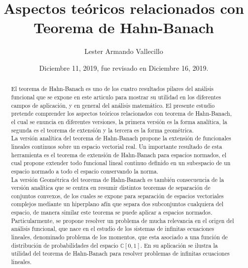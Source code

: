 \documentclass[10pt]{amsart}
\theoremstyle{remark}
\numberwithin{equation}{section}
\begin{document}
\title{Aspectos teóricos relacionados con Teorema de Hahn-Banach}

\author{Lester Armando Vallecillo}
\address{Departamento de Matemáticas, Universidad Nacional Autónoma de Honduras, Francisco Morazán, Tegucigalpa 11101}

\date{Diciembre 11, 2019, fue revisado en Diciembre 16, 2019.}

\maketitle

\begin{abstract}
El teorema de Hahn-Banach es uno de los cuatro resultados pilares del análisis funcional que se expone en este articulo para mostrar su utilidad en los diferentes campos de aplicación, y en general del análisis matemático. El presente estudio pretende comprender los aspectos teóricos relacionados con teorema de Hahn-Banach, el cual se enuncia en diferentes versiones, la primera versión es la forma analítica, la segunda es el teorema de extensión y la tercera es la forma geométrica.\\

La versión analítica del teorema de Hahn-Banach propone la extensión de funcionales lineales continuos sobre un espacio vectorial real. Un importante resultado de esta herramienta es el teorema de extensión de Hahn-Banach para espacios normados, el cual propone extender todo funcional lineal continuo definido en un subespacio de un espacio normado a todo el espacio conservando la norma.\\

La versión Geométrica del teorema de Hahn-Banach es también consecuencia de la versión analítica que se centra en resumir distintos teoremas de separación de conjuntos convexos, de los cuales se expone para separación de espacios vectoriales complejos mediante un hiperplano afín que separa dos subconjuntos cualquiera del espacio, de manera similar este teorema se puede aplicar a espacios normados.\\

Particularmente, se propone resolver un problema de mucha relevancia en el origen del análisis funcional, que nace en el estudio de los sistemas de infinitas ecuaciones lineales, denominado problema de los momentos, que esta asociado a una función de distribución de probabilidades del espacio $\mathbb{C}[0,1]$. En su aplicación se ilustra la utilidad del teorema de Hahn-Banach para resolver problemas de infinitas ecuaciones lineales.\\


\end{abstract}
\end{document}
